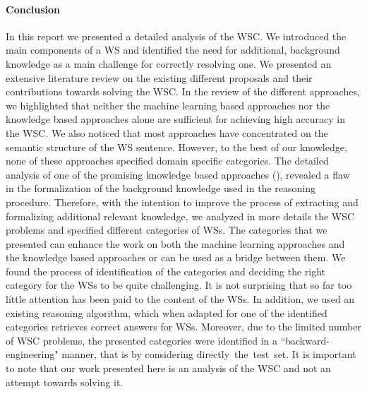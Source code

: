 
\paragraph{Conclusion}
In this report we presented a detailed analysis of the WSC. We introduced the main components of a WS and identified the need for  additional, background knowledge as a main challenge for correctly resolving one. We presented an extensive literature review on the existing different proposals and their contributions towards solving the WSC. In the review of the different approaches, we highlighted that neither the machine learning based approaches nor the knowledge based approaches alone are sufficient for achieving high accuracy in the WSC. We also noticed that most approaches have concentrated on the semantic structure of the WS sentence. However, to the best of our knowledge, none of these approaches specified domain specific categories. The detailed analysis of one of the promising knowledge based approaches (\cite{2018CommonsenseKT}), revealed a flaw in the formalization of the background knowledge used in the reasoning procedure. Therefore, with the intention to improve the process of extracting and formalizing additional relevant knowledge, we analyzed in more details the WSC problems and specified different categories of WSs. The categories that we presented can enhance the work on both the machine learning approaches and the knowledge based approaches or can be used as a bridge between them. We found the process of identification of the categories and deciding the right category for the WSs to be quite challenging. It is not surprising that so far too little attention has been paid to the content of the WSs. In addition, we used an existing reasoning algorithm, which when adapted for one of the identified categories retrieves correct answers for WSs. 
Moreover, due to the limited number of WSC problems, the presented categories were identified in a ``backward-engineering" manner, that is by considering directly~the~test~set. It is important to note that our work presented here is an analysis of the WSC and not an attempt towards solving it.

